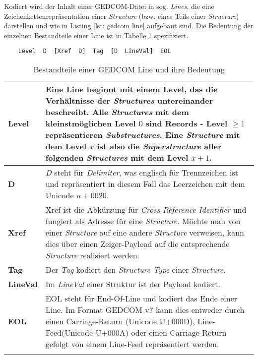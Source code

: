 {Kodiert wird der Inhalt einer GEDCOM-Datei in sog. \textit{Lines}, die eine Zeichenkettenrepräsentation einer \textit{Structure} (bzw. eines Teils einer \textit{Structure}) darstellen und wie in Listing \ref{lst: gedcom line} aufgebaut sind. Die Bedeutung der einzelnen Bestandteile einer Line ist in Tabelle \ref{tab: gedcom line} spezifiziert.
\vspace{1em}
\begin{lstlisting}
	Level  D  [Xref  D]  Tag  [D  LineVal]  EOL
\end{lstlisting}
\label{lst: gedcom line}
\newpage
\bgroup
\def\arraystretch{1.5}%
\setlength{\tabcolsep}{18pt}
\begin{longtable}{|p{2cm}|p{10cm}|}
	\hline
	\textbf{Level} & Eine Line beginnt mit einem Level, das die Verhältnisse der \textit{Structures} untereinander beschreibt. Alle \textit{Structures} mit dem kleinstmöglichen Level $0$ sind Records - Level $\ge1$ repräsentieren \textit{Substructures}. Eine \textit{Structure} mit dem Level $x$ ist also die \textit{Superstructure} aller folgenden \textit{Structures} mit dem Level $x+1$. \\
	\hline
	\textbf{D} & \textit{D} steht für \textit{Delimiter}, was englisch für Trennzeichen ist und repräsentiert in diesem Fall das Leerzeichen mit dem Unicode $u+0020$. \\
	\hline
	\textbf{Xref} & Xref ist die Abkürzung für \textit{Cross-Reference Identifier} und fungiert als Adresse für eine \textit{Structure}. Möchte man von einer \textit{Structure} auf eine andere \textit{Structure} verweisen, kann dies über einen Zeiger-Payload auf die entsprechende \textit{Structure} realisiert werden.\\
	\hline
	\textbf{Tag} & Der \textit{Tag} kodiert den \textit{Structure-Type} einer \textit{Structure}.\\
	\hline
	\textbf{LineVal} & Im \textit{LineVal} einer Struktur ist der Payload kodiert.\\
	\hline
	\textbf{EOL} & EOL steht für End-Of-Line und kodiert das Ende einer Line. Im Format GEDCOM v7 kann dies entweder durch einen Carriage-Return (Unicode U+000D), Line-Feed(Unicode U+000A) oder einen Carriage-Return gefolgt von einem Line-Feed repräsentiert werden.\\
	\hline
	\caption{Bestandteile einer GEDCOM Line und ihre Bedeutung} %
	\label{tab: gedcom line}

\end{longtable}}

